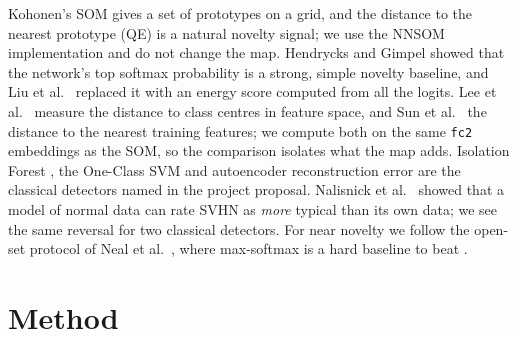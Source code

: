 \documentclass[11pt]{article}
\begin{document}
Kohonen's SOM \cite{kohonen1990som} gives a set of prototypes on a grid, and the distance to the nearest prototype (QE) is a natural novelty signal; we use the NNSOM implementation \cite{jafari_nnsom} and do not change the map. Hendrycks and Gimpel \cite{hendrycks2017baseline} showed that the network's top softmax probability is a strong, simple novelty baseline, and Liu et al.\ \cite{liu2020energy} replaced it with an energy score computed from all the logits. Lee et al.\ \cite{lee2018mahalanobis} measure the distance to class centres in feature space, and Sun et al.\ \cite{sun2022knn} the distance to the nearest training features; we compute both on the same \texttt{fc2} embeddings as the SOM, so the comparison isolates what the map adds. Isolation Forest \cite{liu2008isolation}, the One-Class SVM \cite{scholkopf2001support} and autoencoder reconstruction error \cite{sakurada2014autoencoder} are the classical detectors named in the project proposal. Nalisnick et al.\ \cite{nalisnick2019deep} showed that a model of normal data can rate SVHN as \emph{more} typical than its own data; we see the same reversal for two classical detectors. For near novelty we follow the open-set protocol of Neal et al.\ \cite{neal2018open}, where max-softmax is a hard baseline to beat \cite{vaze2022openset}.

\section{Method}\label{sec:method}
\end{document}
